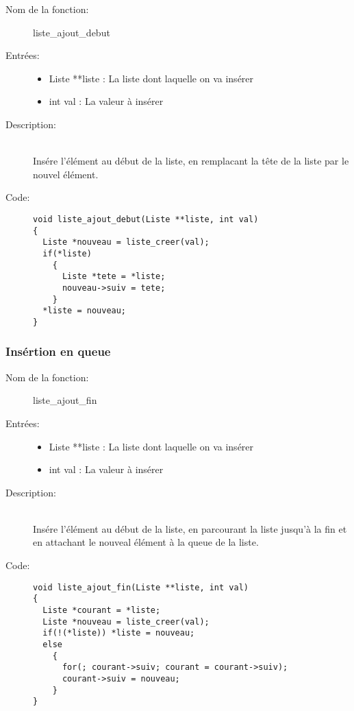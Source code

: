 \documentclass[a4paper]{article}
\begin{document}
\begin{description}
  \item[Nom de la fonction:] liste\_ajout\_debut

  \item[Entrées:] \hfill
    \begin{itemize}
      \item Liste **liste : La liste dont laquelle on va insérer
      \item int val : La valeur à insérer
    \end{itemize}

  \item[Description:] \hfill \\ 
    Insére l'élément au début de la liste, en remplacant la tête de la liste 
    par le nouvel élément.

  \item[Code:] \hfill
  \begin{lstlisting}
void liste_ajout_debut(Liste **liste, int val)
{
  Liste *nouveau = liste_creer(val);
  if(*liste)
    {
      Liste *tete = *liste;
      nouveau->suiv = tete;
    }
  *liste = nouveau;
}
  \end{lstlisting}
\end{description}

\subsubsection{Insértion en queue}

\begin{description}
  \item[Nom de la fonction:] liste\_ajout\_fin

  \item[Entrées:] \hfill
    \begin{itemize}
      \item Liste **liste : La liste dont laquelle on va insérer
      \item int val : La valeur à insérer
    \end{itemize}

  \item[Description:] \hfill \\ 
    Insére l'élément au début de la liste, en parcourant la liste jusqu'à la
    fin et en attachant le nouveal élément à la queue de la liste.


  \item[Code:] \hfill 
  \begin{lstlisting}
void liste_ajout_fin(Liste **liste, int val)
{
  Liste *courant = *liste;
  Liste *nouveau = liste_creer(val);
  if(!(*liste)) *liste = nouveau;
  else
    {
      for(; courant->suiv; courant = courant->suiv);
      courant->suiv = nouveau;
    }
}
  \end{lstlisting}
\end{description}
\end{document}
